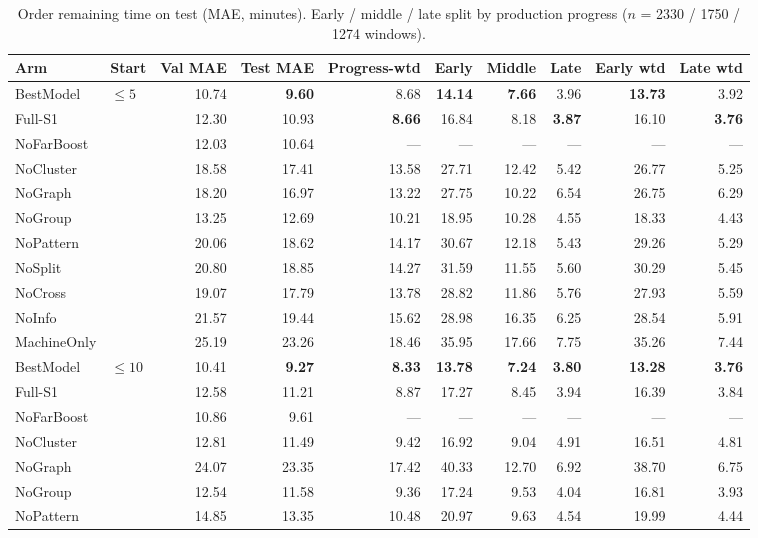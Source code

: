\documentclass[9pt,a4paper,twocolumn]{extarticle}
\begin{document}
\begin{table}[tp]
\centering\scriptsize\setlength{\tabcolsep}{3.2pt}
\caption{Order remaining time on test (MAE, minutes). Early / middle / late split by production progress ($n$ = 2330 / 1750 / 1274 windows).}
\begin{tabular}{llrrrrrrrr}
\toprule
Arm & Start & Val MAE & \textbf{Test MAE} & Progress-wtd & Early & Middle & Late & Early wtd & Late wtd \\
\midrule
BestModel & $\le 5$ & 10.74 & \textbf{9.60} & 8.68 & \textbf{14.14} & \textbf{7.66} & 3.96 & \textbf{13.73} & 3.92 \\
Full-S1 &  & 12.30 & 10.93 & \textbf{8.66} & 16.84 & 8.18 & \textbf{3.87} & 16.10 & \textbf{3.76} \\
NoFarBoost &  & 12.03 & 10.64 & --- & --- & --- & --- & --- & --- \\
NoCluster &  & 18.58 & 17.41 & 13.58 & 27.71 & 12.42 & 5.42 & 26.77 & 5.25 \\
NoGraph &  & 18.20 & 16.97 & 13.22 & 27.75 & 10.22 & 6.54 & 26.75 & 6.29 \\
NoGroup &  & 13.25 & 12.69 & 10.21 & 18.95 & 10.28 & 4.55 & 18.33 & 4.43 \\
NoPattern &  & 20.06 & 18.62 & 14.17 & 30.67 & 12.18 & 5.43 & 29.26 & 5.29 \\
NoSplit &  & 20.80 & 18.85 & 14.27 & 31.59 & 11.55 & 5.60 & 30.29 & 5.45 \\
NoCross &  & 19.07 & 17.79 & 13.78 & 28.82 & 11.86 & 5.76 & 27.93 & 5.59 \\
NoInfo &  & 21.57 & 19.44 & 15.62 & 28.98 & 16.35 & 6.25 & 28.54 & 5.91 \\
MachineOnly &  & 25.19 & 23.26 & 18.46 & 35.95 & 17.66 & 7.75 & 35.26 & 7.44 \\
\midrule
BestModel & $\le 10$ & 10.41 & \textbf{9.27} & \textbf{8.33} & \textbf{13.78} & \textbf{7.24} & \textbf{3.80} & \textbf{13.28} & \textbf{3.76} \\
Full-S1 &  & 12.58 & 11.21 & 8.87 & 17.27 & 8.45 & 3.94 & 16.39 & 3.84 \\
NoFarBoost &  & 10.86 & 9.61 & --- & --- & --- & --- & --- & --- \\
NoCluster &  & 12.81 & 11.49 & 9.42 & 16.92 & 9.04 & 4.91 & 16.51 & 4.81 \\
NoGraph &  & 24.07 & 23.35 & 17.42 & 40.33 & 12.70 & 6.92 & 38.70 & 6.75 \\
NoGroup &  & 12.54 & 11.58 & 9.36 & 17.24 & 9.53 & 4.04 & 16.81 & 3.93 \\
NoPattern &  & 14.85 & 13.35 & 10.48 & 20.97 & 9.63 & 4.54 & 19.99 & 4.44 \\

\end{tabular}
\end{table}
\end{document}
